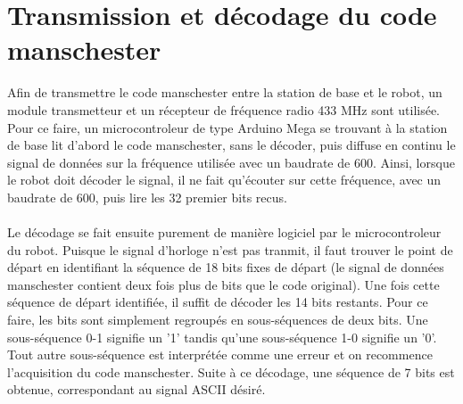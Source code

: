 \section{Transmission et décodage du code manschester}

Afin de transmettre le code manschester entre la station de base et le robot, un module transmetteur et un récepteur de fréquence radio 433 MHz sont utilisée. Pour ce faire, un microcontroleur de type Arduino Mega se trouvant à la station de base lit d'abord le code manschester, sans le décoder, puis diffuse en continu le signal de données sur la fréquence utilisée avec un baudrate de 600. Ainsi, lorsque le robot doit décoder le signal, il ne fait qu'écouter sur cette fréquence, avec un baudrate de 600, puis lire les 32 premier bits recus.
\paragraph{}
Le décodage se fait ensuite purement de manière logiciel par le microcontroleur du robot. Puisque le signal d'horloge n'est pas tranmit, il faut trouver le point de départ en identifiant la séquence de 18 bits fixes de départ (le signal de données manschester contient deux fois plus de bits que le code original). Une fois cette séquence de départ identifiée, il suffit de décoder les 14 bits restants. Pour ce faire, les bits sont simplement regroupés en sous-séquences de deux bits. Une sous-séquence 0-1 signifie un '1' tandis qu'une sous-séquence 1-0 signifie un '0'. Tout autre sous-séquence est interprétée comme une erreur et on recommence l'acquisition du code manschester. Suite à ce décodage, une séquence de 7 bits est obtenue, correspondant au signal ASCII désiré.